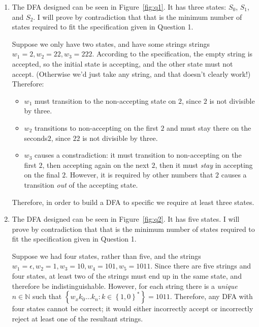 \documentclass{article}
\begin{document}
\begin{enumerate}

\item
    The DFA designed can be seen in Figure~\ref{fig:q1}. It has three states: $S_0$, $S_1$, and $S_2$. I will prove by contradiction that that is the minimum number of states required to fit the specification given in Question 1.

    Suppose we only have two states, and have some strings strings $w_1 = 2, w_2 = 22, w_3 = 222$. According to the specification, the empty string is accepted, so the initial state is accepting, and the other state must not accept. (Otherwise we'd just take any string, and that doesn't clearly work!) Therefore:

        \begin{itemize}
        \item $w_1$ must transition to the non-accepting state on $2$, since $2$ is not divisible by three.
        \item $w_2$ transitions to non-accepting on the first $2$ and must stay there on the seconds$2$, since $22$ is not divisible by three.
        \item $w_3$ causes a constradiction: it must transition to non-accepting on the first $2$, then accepting again on the next $2$, then it must \textit{stay} in accepting on the final $2$. However, it is required by other numbers that $2$ causes a transition \textit{out} of the accepting state.
        \end{itemize}

    Therefore, in order to build a DFA to specific we require at least three states.

\item
    The DFA designed can be seen in Figure~\ref{fig:q2}. It has five states. I will prove by contradiction that that is the minimum number of states required to fit the specification given in Question 1.

    Suppose we had four states, rather than five, and the strings $w_1 = \epsilon, w_2 = 1, w_3 = 10, w_4 = 101, w_5 = 1011$. Since there are five strings and four states, at least two of the strings must end up in the same state, and therefore be indistinguishable. However, for each string there is a \textit{unique} $n \in \mathbb{N}$ such that $\left\{w_xk_0\ldots k_n : k \in \left\{1, 0\right\}^*\right\} = 1011$. Therefore, any DFA with four states cannot be correct; it would either incorrectly accept or incorrectly reject at least one of the resultant strings.

\end{enumerate}
\end{document}
